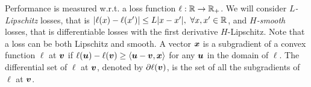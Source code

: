 Performance is measured w.r.t. a loss function $\ell: \mathbb{R} \rightarrow \mathbb{R}_+$. We will consider \emph{$L$-Lipschitz} losses, that is $|\ell(x)-\ell(x')| \leq L |x-x'|, \ \forall x,x' \in \mathbb{R}$, and \emph{$H$-smooth} losses, that is differentiable losses with the first derivative $H$-Lipschitz. Note that a loss can be both Lipschitz and smooth.
A vector $\boldsymbol{x}$ is a subgradient of a convex function $\ell$ at $\boldsymbol{v}$ if $\ell(\boldsymbol{u}) - \ell(\boldsymbol{v}) \ge \langle \boldsymbol{u} - \boldsymbol{v}, \boldsymbol{x} \rangle$ for any $\boldsymbol{u}$ in the domain of $\ell$. The differential set of $\ell$ at $\boldsymbol{v}$, denoted by $\partial \ell(\boldsymbol{v})$, is the set of all the subgradients of $\ell$ at $\boldsymbol{v}$.